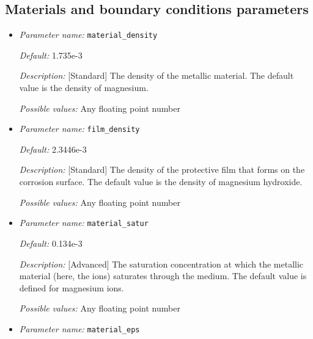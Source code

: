 \subsection{Materials and boundary conditions parameters}
\label{parameters:material}

\begin{itemize}
\item {\it Parameter name:} {\tt material\_density}
\label{parameters:material_density}


{\it Default:} 1.735e-3

{\it Description:} [Standard] The density of the metallic material. The default value is the density of magnesium.

{\it Possible values:} Any floating point number


\item {\it Parameter name:} {\tt film\_density}
\label{parameters:film_density}


{\it Default:} 2.3446e-3

{\it Description:} [Standard] The density of the protective film that forms on the corrosion surface. The default value is the density of magnesium hydroxide.

{\it Possible values:} Any floating point number


\item {\it Parameter name:} {\tt material\_satur}
\label{parameters:material_satur}


{\it Default:} 0.134e-3

{\it Description:} [Advanced] The saturation concentration at which the metallic material (here, the ions) saturates through the medium. The default value is defined for magnesium ions.

{\it Possible values:} Any floating point number


\item {\it Parameter name:} {\tt material\_eps}
\label{parameters:material_eps}



\end{itemize}
